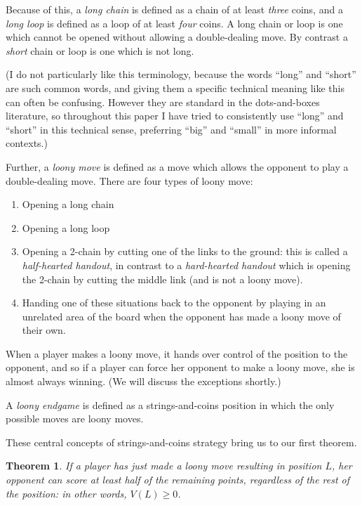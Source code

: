 \documentclass[a4paper,twocolumn]{article}
\newtheorem{sstealing}[thm]{Theorem}
\begin{document}
Because of this, a \emph{long chain} is defined as a chain of at least
\emph{three} coins, and a \emph{long loop} is defined as a loop of at
least \emph{four} coins. A long chain or loop is one which cannot be
opened without allowing a double-dealing move. By contrast a
\emph{short} chain or loop is one which is not long.

(I do not particularly like this terminology, because the words
``long'' and ``short'' are such common words, and giving them a
specific technical meaning like this can often be confusing. However
they are standard in the dots-and-boxes literature, so throughout this
paper I have tried to consistently use ``long'' and ``short'' in this
technical sense, preferring ``big'' and ``small'' in more informal
contexts.)

Further, a \emph{loony move} is defined as a move which allows the
opponent to play a double-dealing move. There are four types of loony
move:

\begin{enumerate}
  \item Opening a long chain
  \item Opening a long loop
  \item Opening a 2-chain by cutting one of the links to the ground:
    this is called a \emph{half-hearted handout}, in contrast to a
    \emph{hard-hearted handout} which is opening the 2-chain by
    cutting the middle link (and is not a loony move).
  \item Handing one of these situations back to the opponent by
    playing in an unrelated area of the board when the opponent has
    made a loony move of their own.
\end{enumerate}

When a player makes a loony move, it hands over control of the
position to the opponent, and so if a player can force her opponent to
make a loony move, she is almost always winning. (We will discuss the
exceptions shortly.)

A \emph{loony endgame} is defined as a strings-and-coins position in
which the only possible moves are loony moves.

These central concepts of strings-and-coins strategy bring us to our
first theorem.

\begin{sstealing} \label{sstealing}
  If a player has just made a loony move resulting in position $L$,
  her opponent can score at least half of the remaining points,
  regardless of the rest of the position: in other words, $V(L) \ge
  0$.
\end{sstealing}
\end{document}
